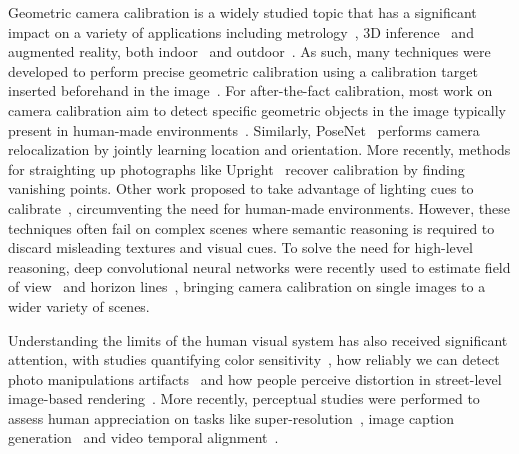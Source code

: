 
Geometric camera calibration is a widely studied topic that has a significant impact on a variety of applications including metrology~\cite{Criminisi2000}, 3D inference~\cite{Criminisi00,Fouhey2013} and augmented reality, both indoor~\cite{hedau-iccv-09,izadinia-cvpr-17} and outdoor~\cite{hoiem-cvpr-06}. As such, many techniques were developed to perform precise geometric calibration using a calibration target inserted beforehand in the image~\cite{Sturm1999,Zhang2002,Heikkila1997,Chen2004}. For after-the-fact calibration, most work on camera calibration aim to detect specific geometric objects in the image typically present in human-made environments~\cite{Rother2000,Melo2013}. Similarly, PoseNet~\cite{kendall-iccv-15} performs camera relocalization by jointly learning location and orientation. More recently, methods for straighting up photographs like Upright~\cite{Lee2014} recover calibration by finding vanishing points. Other work proposed to take advantage of lighting cues to calibrate~\cite{lalonde-ijcv-10,Workman2014}, circumventing the need for human-made environments. However, these techniques often fail on complex scenes where semantic reasoning is required to discard misleading textures and visual cues. To solve the need for high-level reasoning, deep convolutional neural networks were recently used to estimate field of view~\cite{Workman2015a} and horizon lines~\cite{Workman2016}, bringing camera calibration on single images to a wider variety of scenes.

Understanding the limits of the human visual system has also received significant attention, with studies quantifying color sensitivity~\cite{fairchild2013color}, how reliably we can detect photo manipulations artifacts~\cite{Farid2010} and how people perceive distortion in street-level image-based rendering~\cite{Vangorp2013}. More recently, perceptual studies were performed to assess human appreciation on tasks like super-resolution~\cite{ledig-cvpr-17}, image caption generation~\cite{vinyals-cvpr-15} and video temporal alignment~\cite{papazoglou-accv-16}.

